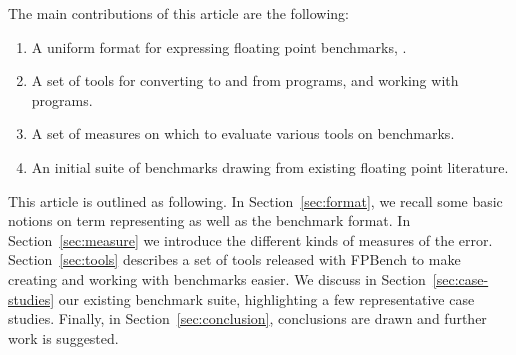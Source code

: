 \documentclass[main.tex]{subfiles}
\begin{document}
The main contributions of this article are the following:
\begin{enumerate}[label=(\roman*)]
\item A uniform format for expressing floating point benchmarks, \core.
\item A set of tools for converting to and from \core programs, and
  working with \core programs.
\item A set of measures on which to evaluate various tools on \name
  benchmarks.
\item An initial suite of benchmarks drawing from existing floating
  point literature.
\end{enumerate}


This article is outlined as following. In Section~\ref{sec:format}, we
recall some basic notions on term representing as well as the
benchmark format. In Section~\ref{sec:measure} we introduce the
different kinds of measures of the error. Section~\ref{sec:tools}
describes a set of tools released with FPBench to make creating and
working with benchmarks easier. We discuss in
Section~\ref{sec:case-studies} our existing benchmark suite,
highlighting a few representative case studies. Finally, in
Section~\ref{sec:conclusion}, conclusions are drawn and further work
is suggested.





%
%
%
%
%
\end{document}
